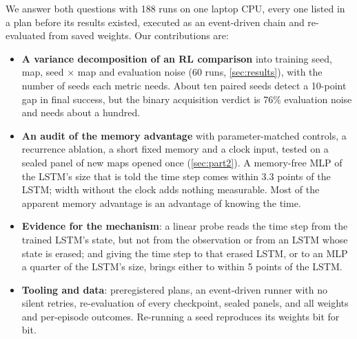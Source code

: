We answer both questions with 188 runs on one laptop CPU, every one listed in a plan before its
results existed, executed as an event-driven chain and re-evaluated from saved weights. Our
contributions are:
\begin{itemize}
  \item \textbf{A variance decomposition of an RL comparison} into training seed, map, seed
  $\times$ map and evaluation noise (60 runs, \cref{sec:results}), with the number of seeds each
  metric needs. About ten paired seeds detect a 10-point gap in final success, but the binary
  acquisition verdict is 76\% evaluation noise and needs about a hundred.
  \item \textbf{An audit of the memory advantage} with parameter-matched controls, a
  recurrence ablation, a short fixed memory and a clock input, tested on a sealed panel of new
  maps opened once (\cref{sec:part2}). A memory-free MLP of the LSTM's size that is told the time
  step comes within 3.3 points of the LSTM; width without the clock adds nothing measurable.
  Most of the apparent memory advantage is an advantage of knowing the time.
  \item \textbf{Evidence for the mechanism}: a linear probe reads the time step from the trained
  LSTM's state, but not from the observation or from an LSTM whose state is erased; and giving
  the time step to that erased LSTM, or to an MLP a quarter of the LSTM's size, brings either to
  within 5 points of the LSTM.
  \item \textbf{Tooling and data}: preregistered plans, an event-driven runner with no silent
  retries, re-evaluation of every checkpoint, sealed panels, and all weights and per-episode
  outcomes. Re-running a seed reproduces its weights bit for bit.
\end{itemize}
